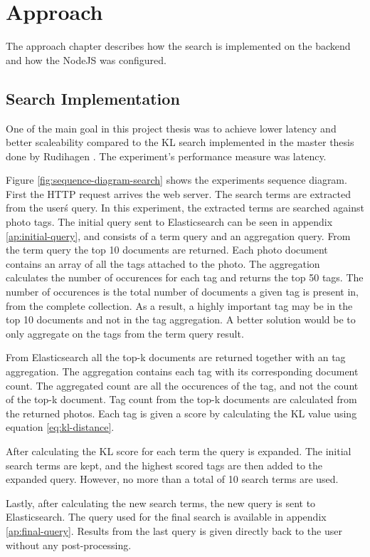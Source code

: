\chapter{Approach}
\label{ch:approach}
The approach chapter describes how the search is implemented on the backend and how the NodeJS was configured.

\section{Search Implementation}
One of the main goal in this project thesis was to achieve lower latency and better scaleability compared to the KL search implemented in the master thesis done by Rudihagen \cite{master-thesis}.
The experiment's performance measure was latency.

Figure \ref{fig:sequence-diagram-search} shows the experiments sequence diagram.
First the HTTP request arrives the web server.
The search terms are extracted from the user\'s query.
In this experiment, the extracted terms are searched against photo tags.
The initial query sent to Elasticsearch can be seen in appendix \ref{ap:initial-query},
and consists of a term query and an aggregation query.
From the term query the top 10 documents are returned.
Each photo document contains an array of all the tags attached to the photo.
The aggregation calculates the number of occurences for each tag and returns the top 50 tags.
The number of occurences is the total number of documents a given tag is present in, from the complete collection.
As a result, a highly important tag may be in the top 10 documents and not in the tag aggregation.
A better solution would be to only aggregate on the tags from the term query result.

From Elasticsearch all the top-k documents are returned together with an tag aggregation.
The aggregation contains each tag with its corresponding document count.
The aggregated count are all the occurences of the tag, and not the count of the top-k document.
Tag count from the top-k documents are calculated from the returned photos.
Each tag is given a score by calculating the KL value using equation \ref{eq:kl-distance}.

After calculating the KL score for each term the query is expanded.
The initial search terms are kept, and the highest scored tags are then added to the expanded query.
However, no more than a total of 10 search terms are used.

Lastly, after calculating the new search terms, the new query is sent to Elasticsearch.
The query used for the final search is available in appendix \ref{ap:final-query}.
Results from the last query is given directly back to the user without any post-processing.


